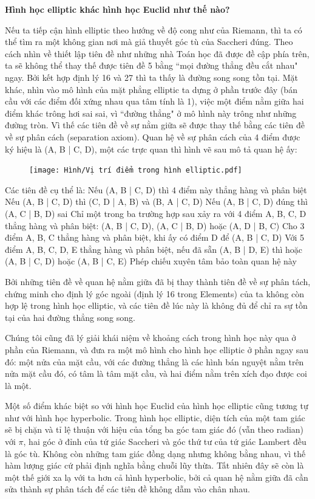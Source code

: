 \begin{multicols}{2}
	\textbf{\color{lichsutoanhoc}Hình học elliptic khác hình học Euclid như thế nào?}
	
	Nếu ta tiếp cận hình elliptic theo hướng về độ cong như của Riemann, thì ta có thể tìm ra một không gian nơi mà giả thuyết góc tù của Saccheri đúng. Theo cách nhìn về thiết lập tiên đề như những nhà Toán học đã được đề cập phía trên, ta sẽ không thể thay thế được tiên đề 5 bằng ``mọi đường thẳng đều cắt nhau" ngay. Bởi kết hợp định lý 16 và 27 thì ta thấy là đường song song tồn tại. Mặt khác, nhìn vào mô hình của mặt phẳng elliptic ta dựng ở phần trước đây (bán cầu với các điểm đối xứng nhau qua tâm tính là 1), việc một điểm nằm giữa hai điểm khác trông hơi sai sai, vì ``đường thẳng" ở mô hình này trông như những đường tròn. Vì thế các tiên đề về sự nằm giữa sẽ được thay thế bằng các tiên đề về sự phân cách (separation axiom). Quan hệ về sự phân cách của 4 điểm được ký hiệu là (A, B | C, D), một các trực quan thì hình vẽ sau mô tả quan hệ ấy:
	
	\begin{figure}[ht]
		\texttt{[image: Hình/Vị trí điểm trong hình elliptic.pdf]}
	\end{figure}
	
	Các tiên đề cụ thể là:
	Nếu (A, B | C, D) thì 4 điểm này thẳng hàng và phân biệt
	Nếu (A, B | C, D) thì (C, D | A, B) và (B, A | C, D)
	Nếu (A, B | C, D) đúng thì (A, C | B, D) sai
	Chỉ một trong ba trường hợp sau xảy ra với 4 điểm A, B, C, D thẳng hàng và phân biệt: (A, B | C, D), (A, C | B, D) hoặc (A, D | B, C)
	Cho 3 điểm A, B, C thẳng hàng và phân biệt, khi ấy có điểm D để (A, B | C, D)
	Với 5 điểm A, B, C, D, E thẳng hàng và phân biệt, nếu đã sẵn (A, B | D, E) thì hoặc (A, B | C, D) hoặc (A, B | C, E)
	Phép chiếu xuyên tâm bảo toàn quan hệ này
	
	Bởi những tiên đề về quan hệ nằm giữa đã bị thay thành tiên đề về sự phân tách, chứng minh cho định lý góc ngoài (định lý 16 trong Elements) của ta không còn hợp lệ trong hình học elliptic, và các  tiên đề lúc này là không đủ để chỉ ra sự tồn tại của hai đường thẳng song song. 
	
	Chúng tôi cũng đã lý giải khái niệm về khoảng cách trong hình học này qua ở phần của Riemann, và đưa ra một mô hình cho hình học elliptic ở phần ngay sau đó: một nửa của mặt cầu, với các đường thẳng là các hình bán nguyệt nằm trên nửa mặt cầu đó, có tâm là tâm mặt cầu, và hai điểm nằm trên xích đạo được coi là một. 
	
	Một số điểm khác biệt so với hình học Euclid của hình học elliptic cũng tương tự như với hình học hyperbolic. Trong hình học elliptic, diện tích của một tam giác sẽ bị chặn và tỉ lệ thuận với hiệu của tổng ba góc tam giác đó (vẫn theo radian) với $\pi$, hai góc ở đỉnh của tứ giác Saccheri và góc thứ tư của tứ giác Lambert đều là góc tù. Không còn những tam giác đồng dạng nhưng không bằng nhau, vì thế hàm lượng giác cứ phải định nghĩa bằng chuỗi lũy thừa. Tất nhiên đây sẽ còn là một thế giới xa lạ với ta hơn cả hình hyperbolic, bởi cả quan hệ nằm giữa đã cần sửa thành sự phân tách để các tiên đề không dẫm vào chân nhau. 
	

\end{multicols}
